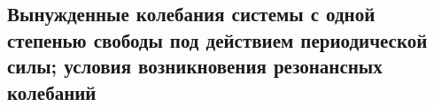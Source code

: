 

\subsection{Вынужденные колебания системы с одной степенью свободы под действием периодической силы; условия возникновения резонансных колебаний}




